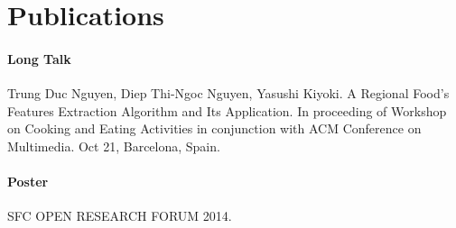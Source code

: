 \chapter*{Publications}

\subsubsection{Long Talk}

Trung Duc Nguyen, Diep Thi-Ngoc Nguyen, Yasushi Kiyoki. A Regional Food's Features Extraction Algorithm and Its Application. In proceeding of Workshop on Cooking and Eating Activities in conjunction with ACM Conference on Multimedia. Oct 21, Barcelona, Spain.~\cite{Nguyen:2013:RFF:2506023.2506027}

\subsubsection{Poster}
SFC OPEN RESEARCH FORUM 2014.

